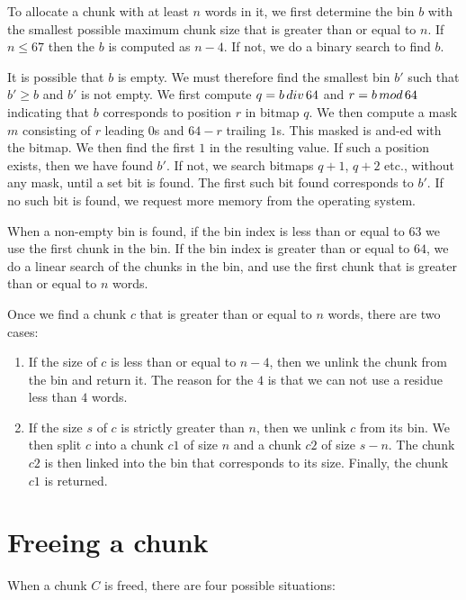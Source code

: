 To allocate a chunk with at least $n$ words in it, we first determine
the bin $b$ with the smallest possible maximum chunk size that is
greater than or equal to $n$.  If $n \le 67$ then the $b$ is computed
as $n-4$.  If not, we do a binary search to find $b$.

It is possible that $b$ is empty.  We must therefore find the smallest
bin $b'$ such that $b' \ge b$ and $b'$ is not empty.  We first compute
$q = b \thinspace div \thinspace 64$ and $r = b \thinspace
mod \thinspace 64$ indicating that $b$ corresponds to position $r$ in
bitmap $q$.  We then compute a mask $m$ consisting of $r$ leading $0$s
and $64-r$ trailing $1$s.  This masked is and-ed with the bitmap.  We
then find the first $1$ in the resulting value.  If such a position
exists, then we have found $b'$.  If not, we search bitmaps $q+1$,
$q+2$ etc., without any mask, until a set bit is found.  The first
such bit found corresponds to $b'$.  If no such bit is found, we
request more memory from the operating system.

When a non-empty bin is found, if the bin index is less than or equal
to $63$ we use the first chunk in the bin.  If the bin index is
greater than or equal to $64$, we do a linear search of the chunks in
the bin, and use the first chunk that is greater than or equal to $n$
words.

Once we find a chunk $c$ that is greater than or equal to $n$ words,
there are two cases:

\begin{enumerate}
\item If the size of $c$ is less than or equal to $n-4$, then we
  unlink the chunk from the bin and return it.  The reason for the $4$
  is that we can not use a residue less than $4$ words.
\item If the size $s$ of $c$ is strictly greater than $n$, then we
  unlink $c$ from its bin.  We then split $c$ into a chunk $c1$ of
  size $n$ and a chunk $c2$ of size $s-n$.  The chunk $c2$ is then
  linked into the bin that corresponds to its size.  Finally, the
  chunk $c1$ is returned.
\end{enumerate}

\section{Freeing a chunk}

When a chunk $C$ is freed, there are four possible situations:

